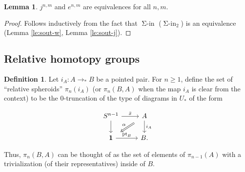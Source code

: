 \documentclass{amsart}
\theoremstyle{definition}
\newtheorem{de}[theorem]{Definition}
\newtheorem{lem}[theorem]{Lemma}
\newcommand{\bs}[1]{\mathrm{pt}_{#1}}
\newcommand{\pto}{\to_*}
\newcommand{\siin}{\operatorname{\Sigma-in}}
\newcommand{\sgtn}{\mathbf{1}}
\begin{document}
\begin{lem}
    $j^{n,m}$ and $e^{n,m}$ are equivalences for all $n,m$.
\end{lem}
\begin{proof}
    Follows inductively from the fact that $\siin$ ($\siin_2$) is an equivalence (Lemma \ref{le:sout-w}, Lemma \ref{le:sout-j}).
\end{proof}

\subsection{Relative homotopy groups}

\begin{de}
    Let $i_A: A \pto B$ be a pointed pair. For $n \geq 1$, define the set of ``relative spheroids'' $\pi_n(i_A)$ (or $\pi_n(B, A)$ when the map $i_A$ is clear from the context) to be the $0$-truncation of the type of diagrams in $U_*$ of the form

    \[\begin{tikzcd}
    	{S^{n-1}} & A \\
    	\sgtn & {B.}
    	\arrow["{\bar{x}}", from=1-1, to=1-2]
    	\arrow[from=1-1, to=2-1]
    	\arrow["\alpha"', shorten <=8pt, shorten >=8pt, Rightarrow, from=1-2, to=2-1]
    	\arrow["{i_A}", from=1-2, to=2-2]
    	\arrow["{\bs{B}}", from=2-1, to=2-2]
    \end{tikzcd}\]
\end{de}
Thus, $\pi_n(B, A)$ can be thought of as the set of elements of $\pi_{n-1}(A)$ with a trivialization (of their representatives) inside of $B$.
\end{document}
